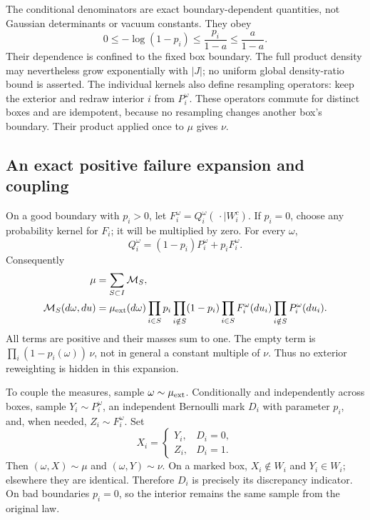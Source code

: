 \documentclass[11pt]{article}
\theoremstyle{remark}
\begin{document}
The conditional denominators are exact boundary-dependent quantities,
not Gaussian determinants or vacuum constants. They obey
\begin{equation}
 0\le-\log(1-p_i)\le\frac{p_i}{1-a}\le\frac a{1-a}.
 \label{nbr-denominator-bound}
\end{equation}
Their dependence is confined to the fixed box boundary. The full
product density may nevertheless grow exponentially with \(|J|\);
no uniform global density-ratio bound is asserted.
The individual kernels also define resampling operators: keep the
exterior and redraw interior \(i\) from \(P_i^\omega\). These
operators commute for distinct boxes and are idempotent, because no
resampling changes another box's boundary. Their product applied once
to \(\mu\) gives \(\nu\).

\subsection{An exact positive failure expansion and coupling}
\label{nbr-coupling-section}

On a good boundary with \(p_i>0\), let
\(F_i^\omega=Q_i^\omega(\,\cdot\mid W_i^c)\).
If \(p_i=0\), choose any probability kernel for \(F_i\); it will be
multiplied by zero. For every \(\omega\),
\begin{equation}
 Q_i^\omega=(1-p_i)P_i^\omega+p_iF_i^\omega.
 \label{nbr-one-mixture}
\end{equation}
Consequently
\begin{align}
 \mu&=\sum_{S\subset I}\mathcal M_S,\notag\\
 \mathcal M_S(d\omega,du)
 &=\mu_{\rm ext}(d\omega)
   \prod_{i\in S}p_i\prod_{i\notin S}(1-p_i)
   \prod_{i\in S}F_i^\omega(du_i)
   \prod_{i\notin S}P_i^\omega(du_i).
 \label{nbr-failure-expansion}
\end{align}
All terms are positive and their masses sum to one. The empty term is
\(\prod_i(1-p_i(\omega))\,\nu\), not in general a constant multiple
of \(\nu\). Thus no exterior reweighting is hidden in this expansion.

To couple the measures, sample \(\omega\sim\mu_{\rm ext}\).
Conditionally and independently across boxes, sample
\(Y_i\sim P_i^\omega\), an independent Bernoulli mark \(D_i\) with
parameter \(p_i\), and, when needed, \(Z_i\sim F_i^\omega\). Set
\begin{equation}
 X_i=\begin{cases}Y_i,&D_i=0,\\Z_i,&D_i=1.\end{cases}
 \label{nbr-coupling}
\end{equation}
Then \((\omega,X)\sim\mu\) and \((\omega,Y)\sim\nu\).
On a marked box, \(X_i\notin W_i\) and \(Y_i\in W_i\); elsewhere
they are identical. Therefore \(D_i\) is precisely its discrepancy
indicator. On bad boundaries \(p_i=0\), so the interior remains the
same sample from the original law.
\end{document}

